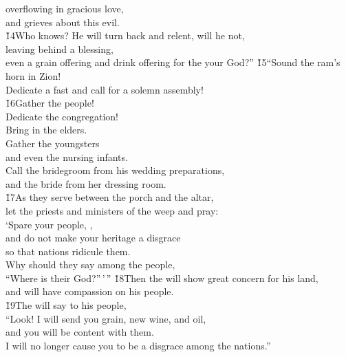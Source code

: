 \begin{poetry}
\poeml overflowing in gracious love, \\
\poemll    and grieves about this evil. \\
\poeml \v{14}Who knows? He will turn back and relent, will he not, \\
\poemll    leaving behind a blessing, \\
\poemlll       even a grain offering and drink offering for the  your God?''
\poeml \v{15}``Sound the ram's horn in Zion! \\
\poemll    Dedicate a fast and call for a solemn assembly! \\
\poeml \v{16}Gather the people! \\
\poemll    Dedicate the congregation! \\
\poeml Bring in the elders. \\
\poemll    Gather the youngsters \\
\poemlll       and even the nursing infants. \\
\poeml Call the bridegroom from his wedding preparations, \\
\poemll    and the bride from her dressing room. \\
\poeml \v{17}As they serve between the porch and the altar, \\
\poemll    let the priests and ministers of the  weep and pray: \\
\poeml `Spare your people, , \\
\poemll    and do not make your heritage a disgrace \\
\poemlll       so that nations ridicule them. \\
\poeml Why should they say among the people, \\
\poemll    ``Where is their God?''\,'\,''
\poeml \v{18}Then the  will show great concern for his land, \\
\poemll    and will have compassion on his people. \\
\poeml \v{19}The  will say to his people, \\
\poemll    ``Look! I will send you grain, new wine, and oil, \\
\poemlll       and you will be content with them. \\
\poeml I will no longer cause you to be a disgrace among the nations.''

\end{poetry}
